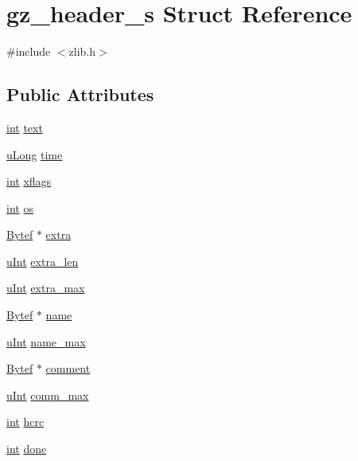 \hypertarget{structgz__header__s}{\section{gz\-\_\-header\-\_\-s Struct Reference}
\label{structgz__header__s}
}


{\ttfamily \#include $<$zlib.\-h$>$}

\subsection*{Public Attributes}
\begin{DoxyCompactItemize}
\item 
\hyperlink{ioapi_8h_a787fa3cf048117ba7123753c1e74fcd6}{int} \hyperlink{structgz__header__s_af94c3fadfed835a501bc1babc4b894f9}{text}
\item 
\hyperlink{zconf_8h_a154b3b80120c903a368fec5f11f3007a}{u\-Long} \hyperlink{structgz__header__s_a5f00bb6f9689c1abf7a54dad449ce9d3}{time}
\item 
\hyperlink{ioapi_8h_a787fa3cf048117ba7123753c1e74fcd6}{int} \hyperlink{structgz__header__s_a40e35dc1a967c6537c6012cf5416210a}{xflags}
\item 
\hyperlink{ioapi_8h_a787fa3cf048117ba7123753c1e74fcd6}{int} \hyperlink{structgz__header__s_a2708d3180d30b0563e3c2c965865cd4f}{os}
\item 
\hyperlink{zconf_8h_aeb722a888064be47e12d05f692e0f407}{Bytef} $\ast$ \hyperlink{structgz__header__s_a397959afc459da7e296c676a3d4c1915}{extra}
\item 
\hyperlink{zconf_8h_a87d141052bcd5ec8a80812a565c70369}{u\-Int} \hyperlink{structgz__header__s_a271798915d64ae1f0d25a3a814ca0aa3}{extra\-\_\-len}
\item 
\hyperlink{zconf_8h_a87d141052bcd5ec8a80812a565c70369}{u\-Int} \hyperlink{structgz__header__s_ada4b174bf7ec0442b1091011c7342ca1}{extra\-\_\-max}
\item 
\hyperlink{zconf_8h_aeb722a888064be47e12d05f692e0f407}{Bytef} $\ast$ \hyperlink{structgz__header__s_a60ae5eee2882d1c25b3bb328972f0149}{name}
\item 
\hyperlink{zconf_8h_a87d141052bcd5ec8a80812a565c70369}{u\-Int} \hyperlink{structgz__header__s_af503d267de15a461b81dcbbfb0d628e5}{name\-\_\-max}
\item 
\hyperlink{zconf_8h_aeb722a888064be47e12d05f692e0f407}{Bytef} $\ast$ \hyperlink{structgz__header__s_a1d4fd0807e838ce4bfde54aa021e18e9}{comment}
\item 
\hyperlink{zconf_8h_a87d141052bcd5ec8a80812a565c70369}{u\-Int} \hyperlink{structgz__header__s_aa0529f45e5c08b3009cfc2a61a86aea0}{comm\-\_\-max}
\item 
\hyperlink{ioapi_8h_a787fa3cf048117ba7123753c1e74fcd6}{int} \hyperlink{structgz__header__s_a29fa8de3acff8d8c7bad61dc924d8564}{hcrc}
\item 
\hyperlink{ioapi_8h_a787fa3cf048117ba7123753c1e74fcd6}{int} \hyperlink{structgz__header__s_ab8fd11f59b76a7d031e24bede8679d9d}{done}
\end{DoxyCompactItemize}


